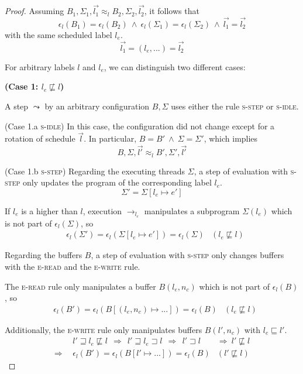 \documentclass[10pt,preprint]{sigplanconf}
\begin{document}
\begin{proof}
  Assuming $B_1,\Sigma_1, \vec{l_1} \approx_l B_2,\Sigma_2, \vec{l_2}$, it follows that
  \[ \epsilon_l(B_1) = \epsilon_l(B_2)~\wedge~\epsilon_l(\Sigma_1) = \epsilon_l(\Sigma_2) ~\wedge~ \vec{l_1} = \vec{l_2}\]
  with the same scheduled label $l_e$.
  \[ \vec{l_1} = (l_e, ...) = \vec{l_2} \]

  For arbitrary labels $l$ and $l_e$, we can distinguish two different cases:

  \textbf{(Case 1: $l_e \not \sqsubseteq l$)}
  
  \noindent A step $\leadsto$ by an arbitrary configuration $B,\Sigma$ uses either the rule \textsc{s-step} or \textsc{s-idle}.

  (Case 1.a \textsc{s-idle}) In this case, the configuration did not change except for a rotation of schedule $\vec{l}$.  In particular, $B = B' ~\wedge~ \Sigma = \Sigma'$, which implies
  \[ B,\Sigma, \vec{l'} \approx_l B', \Sigma', \vec{l'} \]

  (Case 1.b \textsc{s-step}) Regarding the executing threads $\Sigma$, a step of evaluation with \textsc{s-step} only updates the program of the corresponding label $l_e$.
\[ \Sigma' = \Sigma[l_e \mapsto e'] \]

If $l_e$ is a higher than $l$, execution $\rightarrow_{l_e}$ manipulates a subprogram $\Sigma(l_e)$ which is not part of $\epsilon_l(\Sigma)$, so
\begin{align*}
  & \epsilon_l(\Sigma') = \epsilon_l(\Sigma[l_e \mapsto e']) = \epsilon_l(\Sigma) & (l_e \not \sqsubseteq l)
\end{align*}

Regarding the buffers $B$, a step of evaluation with \textsc{s-step} only changes buffers with the \textsc{e-read} and the \textsc{e-write} rule.

The \textsc{e-read} rule only manipulates a buffer $B(l_e,n_c)$ which is not part of $\epsilon_l(B)$, so
\begin{align*}
  & \epsilon_l(B') = \epsilon_l(B[(l_e,n_c) \mapsto ...]) = \epsilon_l(B) & (l_e \not \sqsubseteq l)
\end{align*}

Additionally, the \textsc{e-write} rule only manipulates buffers $B(l',n_c)$ with $l_e \sqsubseteq l'$.
\begin{align*}
 ~&~ l' \sqsupseteq l_e \not \sqsubseteq l~~\Rightarrow~~l' \sqsupseteq l_e \sqsupset l ~~
  \Rightarrow~~ l' \sqsupset l&\Rightarrow~ l' \not \sqsubseteq l \\
\Rightarrow~&~ \epsilon_l(B') = \epsilon_l(B[l' \mapsto ...]) = \epsilon_l(B) & (l' \not \sqsubseteq l)
\end{align*}


\end{proof}
\end{document}
